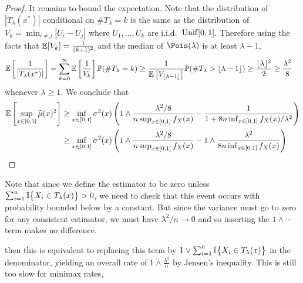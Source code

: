 \documentclass{article}
\begin{document}
\begin{proof}
  \pagebreak



  It remains to bound the expectation.
  Note that the distribution of
  $|T_\lambda(x^*)|$ conditional on $\# T_\lambda = k$ is
  the same as the distribution of
  $V_k = \min_{i \neq j} |U_i - U_j|$ where
  $U_1, \ldots, U_k$ are i.i.d.\ $\operatorname{Unif}[0,1]$.
  Therefore using the facts that
  $\mathbb{E}[V_k] = \frac{1}{(k+1)^2}$
  \cite{pinelis2019order}
  and the median of $\Pois(\lambda)$ is at least $\lambda - 1$,
  \begin{align*}
    \mathbb{E}\left[
    \frac{1} {|T_\lambda(x^*)|}
    \right]
    &=
      \sum_{k=0}^\infty
      \mathbb{E}\left[
      \frac{1}{V_k}
      \right]
      \mathbb{P}(\# T_\lambda = k)
      \geq
      \frac{1}{\mathbb{E}\left[V_{\lfloor\lambda - 1 \rfloor} \right]}
      \mathbb{P}(\# T_\lambda > \lfloor \lambda - 1 \rfloor)
      \geq
      \frac{\lfloor \lambda \rfloor^2}{2}
      \geq
      \frac{\lambda^2}{8}
  \end{align*}
  whenever $\lambda \geq 1$.
  We conclude that
\begin{align*}
    \mathbb{E}\left[
    \sup_{x \in [0,1]}
    \widehat\mu(x)^2
    \right]
    &\geq
      \inf_{x \in [0,1]} \sigma^2(x)
      \left(
      1 \wedge
      \frac{\lambda^2 / 8}
      {n \sup_{x \in [0,1]} f_X(x)}
      - \frac{1}
      {1 + 8n \inf_{x \in [0,1]} f_X(x) / \lambda^2}
      \right) \\
    &\geq
      \inf_{x \in [0,1]} \sigma^2(x)
      \left(
      1 \wedge
      \frac{\lambda^2 / 8}
      {n \sup_{x \in [0,1]} f_X(x)}
      - 1 \wedge
      \frac{\lambda^2}
      {8n \inf_{x \in [0,1]} f_X(x)}
      \right) \\
  \end{align*}
\end{proof}
%
Note that since we define the estimator to be zero unless
$\sum_{i=1}^n \mathbb{I}\big\{ X_i \in T_\lambda(x) \big\} > 0$,
we need to check that this event occurs with probability
bounded below by a constant.
But since the variance must go to zero for any consistent estimator,
we must have $\lambda^2/n \to 0$ and so
inserting the $1 \wedge \cdots$ term makes no difference.




then this is equivalent to replacing this term by
$1 \vee \sum_{i=1}^n \mathbb{I}\big\{ X_i \in T_\lambda(x) \big\}$
in the denominator,
yielding an overall rate of
$1 \wedge \frac{\lambda^2}{n}$ by Jensen's inequality.
This is still too slow for minimax rates,





\printbibliography
\end{document}
